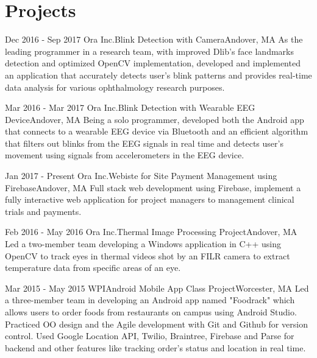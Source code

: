 \documentclass[10pt,a4paper,merriweather]{moderncv}        %
\begin{document}
\section{Projects}

\cventry
{Dec 2016 - Sep 2017}
{Ora Inc.}{Blink Detection with Camera}{Andover, MA}{}
{As the leading programmer in a research team, with improved Dlib's face landmarks detection and optimized OpenCV implementation, developed and implemented an application that accurately detects user's blink patterns and provides real-time data analysis for various ophthalmology research purposes.}
\vspace{.05cm}

\cventry
{Mar 2016 - Mar 2017}
{Ora Inc.}{Blink Detection with Wearable EEG Device}{Andover, MA}{}
{Being a solo programmer, developed both the Android app that connects to a wearable EEG device via Bluetooth and an efficient algorithm that filters out blinks from the EEG signals in real time and detects user's movement using signals from accelerometers in the EEG device.}
\vspace{.05cm}

\cventry
{Jan 2017 - Present}
{Ora Inc.}{Webiste for Site Payment Management using Firebase}{Andover, MA}{}
{Full stack web development using Firebase, implement a fully interactive web application for project managers to management clinical trials and payments.   }
\vspace{.05cm}

\cventry
{Feb 2016 - May 2016}
{Ora Inc.}{Thermal Image Processing Project}{Andover, MA}{}
{Led a two-member team developing a Windows application in C++ using OpenCV to track eyes in thermal videos shot by an FILR camera to extract temperature data from specific areas of an eye. }
\vspace{.05cm}

\cventry
{Mar 2015 - May 2015}
{WPI}{Android Mobile App Class Project}{Worcester, MA}{}
{Led a three-member team in developing an Android app named "Foodrack" which allows users to order foods from restaurants on campus using Android Studio. Practiced OO design and the Agile development with Git and Github for version control. Used Google Location API, Twilio, Braintree, Firebase and Parse for backend and other features like tracking order's status and location in real time. }

\end{document}
